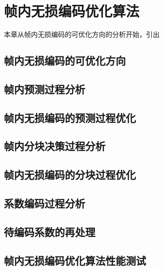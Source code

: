 \chapter{帧内无损编码优化算法}
\label{cha:c3}
本章从帧内无损编码的可优化方向的分析开始，引出

\section{帧内无损编码的可优化方向}

\section{帧内预测过程分析}
\label{cha:IntraPredDetail}

\section{帧内无损编码的预测过程优化}

\section{帧内分块决策过程分析}

\section{帧内无损编码的分块过程优化}

\section{系数编码过程分析}

\section{待编码系数的再处理}

\section{帧内无损编码优化算法性能测试}